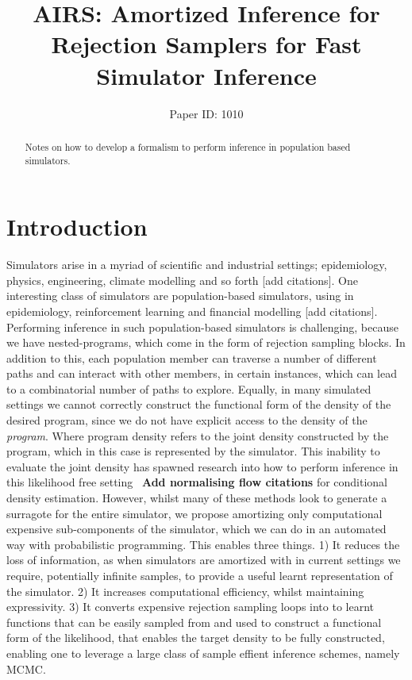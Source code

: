 \documentclass{article}
\title{AIRS: Amortized Inference for Rejection Samplers for Fast Simulator Inference}
\author{%
Paper ID: 1010 }
\begin{document}

\maketitle

\begin{abstract}

    Notes on how to develop a formalism to perform inference in population based simulators.
\end{abstract}

\section{Introduction}
\label{sec:intro}
Simulators arise in a myriad of scientific and industrial settings; epidemiology, physics, engineering, climate modelling and so forth [add citations].
One interesting class of simulators are population-based simulators, using in epidemiology, reinforcement learning
and financial modelling [add citations].
Performing inference in such population-based simulators is challenging, because we have nested-programs, 
which come in the form of rejection sampling blocks. 
In addition to this, each population member can traverse a number of different paths and 
can interact with other members, in certain instances, which can lead to a combinatorial number of paths 
to explore. 
Equally, in many simulated settings we cannot correctly construct the functional form of the density of the desired program,
since we do not have explicit access to the density of the \emph{program}.
Where program density refers to the joint density constructed by the program, which in this case is represented by the simulator.
This inability to evaluate the joint density has spawned research into how to perform 
inference in this likelihood free setting~\cite{greenberg2019automatic} \textbf{Add normalising flow citations}
for conditional density estimation. However, whilst many of these methods look to generate a surragote 
for the entire simulator, we propose amortizing only computational expensive sub-components 
of the simulator, which we can do in an automated way with probabilistic programming. 
This enables three things. 
1) It reduces the loss of information, as when simulators are amortized with in current
settings we require, potentially infinite samples, to provide a useful learnt representation of the simulator. 
2) It increases computational efficiency, whilst maintaining expressivity. 
3) It converts expensive rejection sampling loops into to learnt functions that can be 
easily sampled from and used to construct a functional form of the likelihood, that enables the 
target density to be fully constructed, enabling one to leverage a large class of sample effient inference schemes, namely MCMC.
\end{document}
